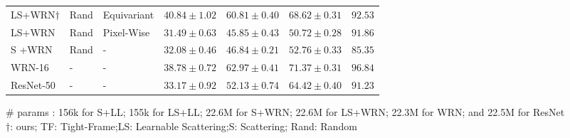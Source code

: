 \documentclass[10pt,twocolumn,letterpaper]{article}
\begin{document}
\begin{table*}[t]
\begin{tabularx}{0.75\linewidth}{lllllll}
        LS+WRN$\dagger$&Rand &Equivariant&$ 40.84\pm1.02$ & $60.81\pm0.40$ &$68.62\pm0.31$&$ 92.53$  \\
        LS+WRN& Rand &Pixel-Wise&$31.49\pm0.63$ & $45.85\pm0.43$ &$50.72\pm0.28 $&$ 91.86 $  \\
        S +WRN&Rand &-&$32.08\pm0.46$ & $46.84\pm0.21$ &$52.76\pm0.33$&$85.35$ \\
        WRN-16&-&-& $38.78\pm 0.72$ & $62.97\pm 0.41$ &$\mathbf{71.37}\pm0.31$& $\mathbf{96.84}$  \\
       ResNet-50&-&-& $33.17 \pm0.92$ & $ 52.13\pm0.74 $ &$64.42\pm0.40 $&$ 91.23$   \\ \hline
    \end{tabularx}
\begin{flushleft}
\scriptsize
\vspace{-5pt}
\hspace{65pt}$\#$ params : 156k for S+LL; 155k for LS+LL; 22.6M for S+WRN;  22.6M for LS+WRN; 22.3M for WRN; and 22.5M for ResNet\\
\hspace{65pt}$\dagger$: ours;\hspace{5pt}  TF: Tight-Frame;\hspace{5pt}LS: Learnable Scattering;\hspace{5pt}S: Scattering;\hspace{5pt} Rand: Random\\
\end{flushleft}
\vspace{-20pt}
\end{table*} 
\end{document}
